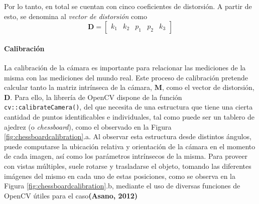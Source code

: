 Por lo tanto, en total se cuentan con cinco coeficientes de distorsión. A partir de esto, se denomina al \textit{vector de distorsión} como
\begin{equation}
    \bm{D} = 
    \begin{bmatrix}
    k_1 & k_2 & p_1 & p_2 & k_3
    \end{bmatrix}
    \label{eq:distortionvector}
\end{equation}

\paragraph{Calibración}
La calibración de la cámara es importante para relacionar las mediciones de la misma con las mediciones del mundo real. Este proceso de calibración pretende calcular tanto la matriz intrínseca de la cámara, $\bm{M}$, como el vector de distorsión, $\bm{D}$. Para ello, la librería de OpenCV dispone de la función \texttt{cv::calibrateCamera()}, del que necesita de una estructura que tiene una cierta cantidad de puntos identificables e individuales, tal como puede ser un tablero de ajedrez (o \textit{chessboard}), como el observado en la Figura \ref{fig:chessboardcalibration}.a. Al observar esta estructura desde distintos ángulos, puede computarse la ubicación relativa y orientación de la cámara en el momento de cada imagen, así como los parámetros intrínsecos de la misma. Para proveer con vistas múltiples, suele rotarse y trasladarse el objeto, tomando las diferentes imágenes del mismo en cada uno de estas posiciones, como se observa en la Figura \ref{fig:chessboardcalibration}.b, mediante el uso de diversas funciones de OpenCV útiles para el caso\textbf{(Asano, 2012)}

